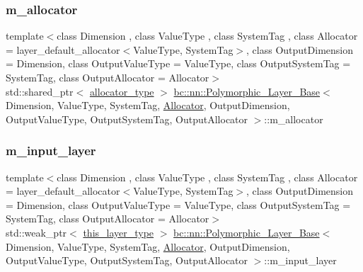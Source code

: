 \subsubsection{\texorpdfstring{m\+\_\+allocator}{m\_allocator}}
{\footnotesize\ttfamily template$<$class Dimension , class Value\+Type , class System\+Tag , class Allocator  = layer\+\_\+default\+\_\+allocator$<$\+Value\+Type, System\+Tag$>$, class Output\+Dimension  = Dimension, class Output\+Value\+Type  = Value\+Type, class Output\+System\+Tag  = System\+Tag, class Output\+Allocator  = Allocator$>$ \\
std\+::shared\+\_\+ptr$<$ \hyperlink{structbc_1_1nn_1_1Polymorphic__Layer__Base_a1414f8c37dea6254aebf63e4486ed818}{allocator\+\_\+type} $>$ \hyperlink{structbc_1_1nn_1_1Polymorphic__Layer__Base}{bc\+::nn\+::\+Polymorphic\+\_\+\+Layer\+\_\+\+Base}$<$ Dimension, Value\+Type, System\+Tag, \hyperlink{classbc_1_1allocators_1_1Allocator}{Allocator}, Output\+Dimension, Output\+Value\+Type, Output\+System\+Tag, Output\+Allocator $>$\+::m\+\_\+allocator\hspace{0.3cm}{\ttfamily [protected]}}

\mbox{\label{structbc_1_1nn_1_1Polymorphic__Layer__Base_abf80deb81025924557a3f7eca809d4e3}} 
\subsubsection{\texorpdfstring{m\+\_\+input\+\_\+layer}{m\_input\_layer}}
{\footnotesize\ttfamily template$<$class Dimension , class Value\+Type , class System\+Tag , class Allocator  = layer\+\_\+default\+\_\+allocator$<$\+Value\+Type, System\+Tag$>$, class Output\+Dimension  = Dimension, class Output\+Value\+Type  = Value\+Type, class Output\+System\+Tag  = System\+Tag, class Output\+Allocator  = Allocator$>$ \\
std\+::weak\+\_\+ptr$<$ \hyperlink{structbc_1_1nn_1_1Polymorphic__Layer__Base_a6087076d2e0a31e6bbdc2c2039c3ab52}{this\+\_\+layer\+\_\+type} $>$ \hyperlink{structbc_1_1nn_1_1Polymorphic__Layer__Base}{bc\+::nn\+::\+Polymorphic\+\_\+\+Layer\+\_\+\+Base}$<$ Dimension, Value\+Type, System\+Tag, \hyperlink{classbc_1_1allocators_1_1Allocator}{Allocator}, Output\+Dimension, Output\+Value\+Type, Output\+System\+Tag, Output\+Allocator $>$\+::m\+\_\+input\+\_\+layer\hspace{0.3cm}{\ttfamily [protected]}}

